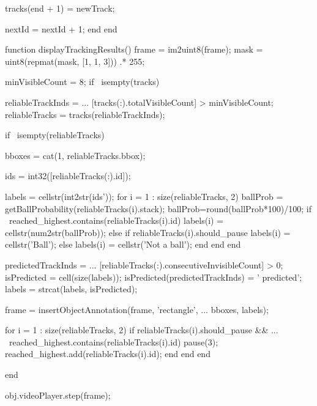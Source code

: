\documentclass[10pt,a4paper]{article}
\begin{document}
\begin{verbatimtab}[2]
			tracks(end + 1) = newTrack;

			nextId = nextId + 1;
		end
	end

	function displayTrackingResults()
		frame = im2uint8(frame);
		mask = uint8(repmat(mask, [1, 1, 3])) .* 255;

		minVisibleCount = 8;
		if ~isempty(tracks)

			reliableTrackInds = ...
				[tracks(:).totalVisibleCount] > minVisibleCount;
			reliableTracks = tracks(reliableTrackInds);

			if ~isempty(reliableTracks)

				bboxes = cat(1, reliableTracks.bbox);

				ids = int32([reliableTracks(:).id]);

				labels = cellstr(int2str(ids'));
				for i = 1 : size(reliableTracks, 2)
					ballProb = getBallProbability(reliableTracks(i).stack);
					ballProb=round(ballProb*100)/100;
					if ~reached_highest.contains(reliableTracks(i).id)
						labels(i) = cellstr(num2str(ballProb));
					else
						if reliableTracks(i).should_pause
							labels(i) = cellstr('Ball');
						else
							labels(i) = cellstr('Not a ball');
						end
					end
				end

				predictedTrackInds = ...
					[reliableTracks(:).consecutiveInvisibleCount] > 0;
				isPredicted = cell(size(labels));
				isPredicted(predictedTrackInds) = {' predicted'};
				labels = strcat(labels, isPredicted);

				frame = insertObjectAnnotation(frame, 'rectangle', ...
					bboxes, labels);

				for i = 1 : size(reliableTracks, 2)
					if reliableTracks(i).should_pause && ...
					 ~reached_highest.contains(reliableTracks(i).id)
						pause(3);
						reached_highest.add(reliableTracks(i).id);
					end
				end
			end


		end

		obj.videoPlayer.step(frame);


\end{verbatimtab}
\end{document}
